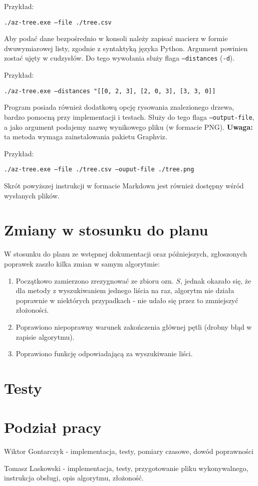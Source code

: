 \documentclass[a4paper,12p]{article}
\begin{document}
Przykład:

\texttt{./az-tree.exe --file ./tree.csv}

Aby podać dane bezpośrednio w konsoli należy zapisać macierz w formie dwuwymiarowej listy, zgodnie z syntaktyką języka Python. Argument powinien zostać ujęty w cudzysłów. Do tego wywołania służy flaga \texttt{--distances} (\texttt{-d}).

Przykład:

\texttt{./az-tree.exe --distances "[[0, 2, 3], [2, 0, 3], [3, 3, 0]]}

Program posiada również dodatkową opcję rysowania znalezionego drzewa, bardzo pomocną przy implementacji i testach. Służy do tego flaga \texttt{--output-file}, a jako argument podajemy nazwę wynikowego pliku (w formacie PNG). \textbf{Uwaga:} ta metoda wymaga zainstalowania pakietu Graphviz.

Przykład:

\texttt{./az-tree.exe --file ./tree.csv --ouput-file ./tree.png}

Skrót powyższej instrukcji w formacie Markdown jest również dostępny wśród wysłanych plików.

\section{Zmiany w stosunku do planu}

W stosunku do planu ze wstępnej dokumentacji oraz późniejszych, zgłoszonych poprawek zaszło kilka zmian w samym algorytmie:

\begin{enumerate}
	\item Początkowo zamierzono zrezygnować ze zbioru ozn. $S$, jednak okazało się, że dla metody z wyszukiwaniem jednego liścia na raz, algorytm nie działa poprawnie w niektórych przypadkach - nie udało się przez to zmniejszyć złożoności.
	\item Poprawiono niepoprawny warunek zakończenia głównej pętli (drobny błąd w zapisie algorytmu).
	\item Poprawiono funkcję odpowiadającą za wyszukiwanie liści.
\end{enumerate}

\section{Testy}


\section{Podział pracy}

Wiktor Gontarczyk - implementacja, testy, pomiary czasowe, dowód poprawności

Tomasz Laskowski - implementacja, testy, przygotowanie pliku wykonywalnego, instrukcja obsługi, opis algorytmu, złożoność.
\end{document}
